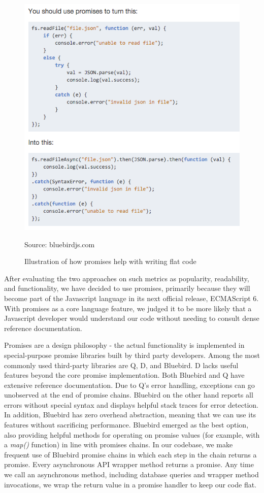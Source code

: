 \documentclass[pageno]{jpaper}
\newcommand{\source}[1]{\caption*{Source: {#1}} }
\begin{document}
\begin{figure}[h]
\begin{center}
\includegraphics[scale=0.4] {promises}
\caption{Illustration of how promises help with writing flat code}
 \label{fig:promises}
\source{bluebirdjs.com}
\end{center}
\end{figure}

After evaluating the two approaches on such metrics as popularity, readability, and functionality, we have decided to use promises, primarily because they will become part of the Javascript language in its next official release, ECMAScript 6. With promises as a core language feature, we judged it to be more likely that a Javascript developer would understand our code without needing to consult dense reference documentation.

Promises are a design philosophy - the actual functionality is implemented in special-purpose promise libraries built by third party developers. Among the most commonly used third-party libraries are Q, D, and Bluebird. D lacks useful features beyond the core promise implementation. Both Bluebird and Q have extensive reference documentation. Due to Q's error handling, exceptions can go unobserved at the end of promise chains. Bluebird on the other hand reports all errors without special syntax and displays helpful stack traces for error detection. In addition, Bluebird has zero overhead abstraction, meaning that we can use its features without sacrificing performance. Bluebird emerged as the best option, also providing helpful methods for operating on promise values (for example, with a {\em map()} function) in line with promises chains. In our codebase, we make frequent use of Bluebird promise chains in which each step in the chain returns a promise. Every asynchronous API wrapper method returns a promise. Any time we call an asynchronous method, including database queries and wrapper method invocations, we wrap the return value in a promise handler to keep our code flat.
\end{document}
